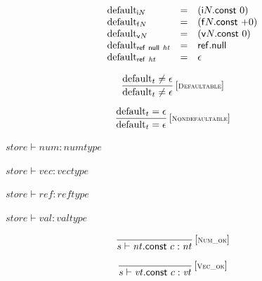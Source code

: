\vspace{1ex}

$$
\begin{array}[t]{@{}lcl@{}l@{}}
{{\mathrm{default}}}_{{\mathsf{i}}{N}} & = & ({\mathsf{i}}{N}{.}\mathsf{const}~0) \\
{{\mathrm{default}}}_{{\mathsf{f}}{N}} & = & ({\mathsf{f}}{N}{.}\mathsf{const}~{+0}) \\
{{\mathrm{default}}}_{{\mathsf{v}}{N}} & = & ({\mathsf{v}}{N}{.}\mathsf{const}~0) \\
{{\mathrm{default}}}_{\mathsf{ref}~\mathsf{null}~{\mathit{ht}}} & = & \mathsf{ref{.}null} \\
{{\mathrm{default}}}_{\mathsf{ref}~{\mathit{ht}}} & = & \epsilon \\
\end{array}
$$

$$
\begin{array}{@{}c@{}}\displaystyle
\frac{
{{\mathrm{default}}}_{t} \neq \epsilon
}{
{{\mathrm{default}}}_{t} \neq \epsilon
} \, {[\textsc{\scriptsize Defaultable}]}
\qquad
\end{array}
$$

$$
\begin{array}{@{}c@{}}\displaystyle
\frac{
{{\mathrm{default}}}_{t} = \epsilon
}{
{{\mathrm{default}}}_{t} = \epsilon
} \, {[\textsc{\scriptsize Nondefaultable}]}
\qquad
\end{array}
$$

\vspace{1ex}

$\boxed{{\mathit{store}} \vdash {\mathit{num}} : {\mathit{numtype}}}$

$\boxed{{\mathit{store}} \vdash {\mathit{vec}} : {\mathit{vectype}}}$

$\boxed{{\mathit{store}} \vdash {\mathit{ref}} : {\mathit{reftype}}}$

$\boxed{{\mathit{store}} \vdash {\mathit{val}} : {\mathit{valtype}}}$

$$
\begin{array}{@{}c@{}}\displaystyle
\frac{
}{
s \vdash {\mathit{nt}}{.}\mathsf{const}~c : {\mathit{nt}}
} \, {[\textsc{\scriptsize Num\_ok}]}
\qquad
\end{array}
$$

$$
\begin{array}{@{}c@{}}\displaystyle
\frac{
}{
s \vdash {\mathit{vt}}{.}\mathsf{const}~c : {\mathit{vt}}
} \, {[\textsc{\scriptsize Vec\_ok}]}
\qquad
\end{array}
$$

